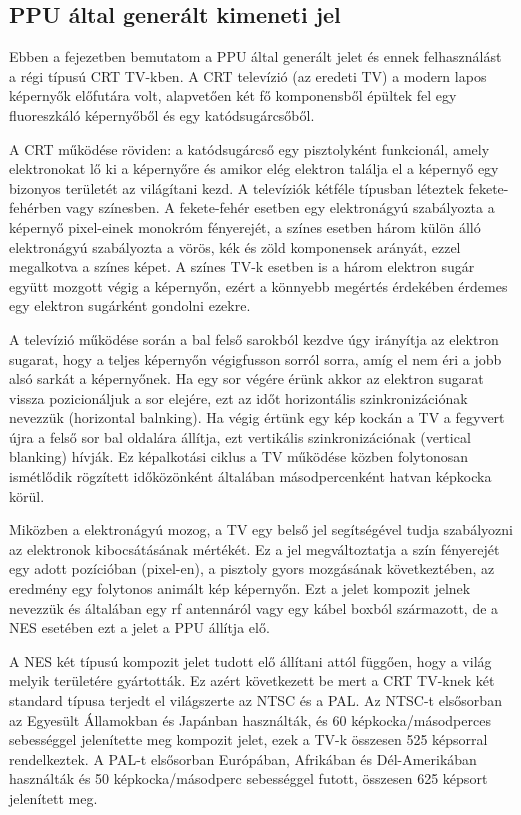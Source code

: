 	\subsection{PPU által generált kimeneti jel}
	Ebben a fejezetben bemutatom a PPU által generált jelet és ennek felhasználást a régi típusú CRT TV-kben. A CRT televízió (az eredeti TV) a modern lapos képernyők előfutára volt, alapvetően két fő komponensből épültek fel egy fluoreszkáló képernyőből és egy katódsugárcsőből. 
	
	A CRT működése röviden: a katódsugárcső egy pisztolyként funkcionál, amely elektronokat lő ki a képernyőre és amikor elég elektron találja el a képernyő egy bizonyos területét az világítani kezd. A televíziók kétféle típusban léteztek fekete-fehérben vagy színesben. A fekete-fehér esetben egy elektronágyú szabályozta a képernyő pixel-einek monokróm fényerejét, a színes esetben három külön álló elektronágyú szabályozta a vörös, kék és zöld komponensek arányát, ezzel megalkotva a színes képet. A színes TV-k esetben is a három elektron sugár együtt mozgott végig a képernyőn, ezért a könnyebb megértés érdekében érdemes egy elektron sugárként gondolni ezekre. 
	
	A televízió működése során a bal felső sarokból kezdve úgy irányítja az elektron sugarat, hogy a teljes képernyőn végigfusson sorról sorra, amíg el nem éri a jobb alsó sarkát a képernyőnek. Ha egy sor végére érünk akkor az elektron sugarat vissza pozicionáljuk a sor elejére, ezt az időt horizontális szinkronizációnak nevezzük (horizontal balnking). Ha végig értünk egy kép kockán a TV a fegyvert újra a felső sor bal oldalára állítja, ezt vertikális szinkronizációnak (vertical blanking) hívják. Ez képalkotási ciklus a TV működése közben folytonosan ismétlődik rögzített időközönként általában másodpercenként hatvan képkocka körül. 
	
	Miközben a elektronágyú mozog, a TV egy belső jel segítségével tudja szabályozni az elektronok kibocsátásának mértékét. Ez a jel megváltoztatja a szín fényerejét egy adott pozícióban (pixel-en), a pisztoly gyors mozgásának következtében, az eredmény egy folytonos animált kép képernyőn. Ezt a jelet kompozit jelnek nevezzük és általában egy rf antennáról vagy egy kábel boxból származott, de a NES esetében ezt a jelet a PPU állítja elő. 
	
	
	A NES két típusú kompozit jelet tudott elő állítani attól függően, hogy a világ melyik területére gyártották. Ez azért következett be mert a CRT TV-knek két standard típusa terjedt el világszerte az NTSC és a PAL. Az NTSC-t elsősorban az Egyesült Államokban és Japánban használták, és 60 képkocka/másodperces sebességgel jelenítette meg kompozit jelet, ezek a TV-k összesen 525 képsorral rendelkeztek. A PAL-t elsősorban Európában, Afrikában és Dél-Amerikában használták és 50 képkocka/másodperc sebességgel futott, összesen 625 képsort jelenített meg.
	
